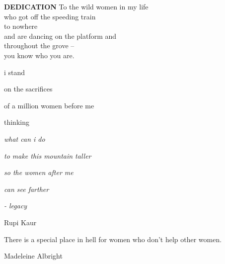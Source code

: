 
\clearpage

\clearpage\thispagestyle{empty}\mbox{}\clearpage 

\begin{center}
{\textbf{DEDICATION}}
\hspace{0pt}
\vfill
To the wild women in my life \\
who got off the speeding train \\ 
to nowhere \\
and are dancing on the platform and \\
throughout the grove -- \\
you know who you are. 
\vfill


\raggedright{i stand} \\
\raggedright{on the sacrifices} \\
\raggedright{of a million women before me} \\
\raggedright{thinking} \\
\raggedright{\textit{what can i do}} \\
\raggedright{\textit{to make this mountain taller}} \\
\raggedright{\textit{so the women after me}} \\
\raggedright{\textit{can see farther}} \\
\raggedright{\textit{- legacy}} \\
\raggedright{Rupi Kaur}

\vfill
\raggedright{There is a special place in hell for women who don't help other women.} \\
\raggedright{Madeleine Albright}
\vfill
\hspace{0pt}
\end{center}

